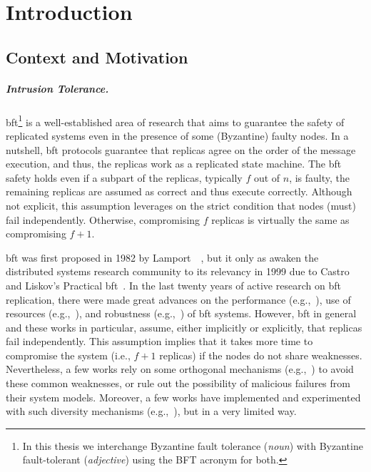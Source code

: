 \chapter{Introduction}
\label{chap:introduction}

\section{Context and Motivation}
\paragraph{Intrusion Tolerance.}
\gls{bft}\footnote{In this thesis we interchange Byzantine fault tolerance (\emph{noun}) with Byzantine fault-tolerant (\emph{adjective}) using the BFT acronym for both.} is a well-established area of research that aims to guarantee the safety of replicated systems even in the presence of some (Byzantine) faulty nodes.
In a nutshell, \gls{bft} protocols guarantee that replicas agree on the order of the message execution, and thus, the replicas work as a replicated state machine.
The \gls{bft} safety holds even if a subpart of the replicas, typically $f$ out of $n$, is faulty, the remaining replicas are assumed as correct and thus execute correctly.
Although not explicit, this assumption leverages on the strict condition that nodes (must) fail independently.
Otherwise, compromising $f$ replicas is virtually the same as compromising $f+1$.


\gls{bft} was first proposed in 1982 by Lamport~\etal{}~\cite{Lamport:1982}, but it only as awaken the distributed systems research community to its relevancy in 1999 due to Castro and Liskov's Practical \gls{bft}~\cite{Castro:1999}. 
In the last twenty years of active research on \gls{bft} replication, there were made great advances on the performance (e.g.,~\cite{Kotla:2010,Aublin:2015,Behl:2015}), use of resources (e.g.,~\cite{Yin:2003,Wood:2011,Veronese:2013,Liu:2016,Behl:2017}), and robustness (e.g.,~\cite{Amir:2011,Bessani:2014,Clement:2009b}) of \gls{bft} systems.
However, \gls{bft} in general and these works in particular, assume, either implicitly or explicitly, that replicas fail independently. 
This assumption implies that it takes more time to compromise the system (i.e., $f+1$ replicas) if the nodes do not share weaknesses. 
Nevertheless, a few works rely on some orthogonal mechanisms (e.g.,~\cite{Roeder:2010,Avizienis:1995}) to avoid these common weaknesses, or rule out the possibility of malicious failures from their system models.
Moreover, a few works have implemented and experimented with such diversity mechanisms (e.g.,~\cite{Castro:2003,Roeder:2010,Amir:2011}), but in a very limited way.



